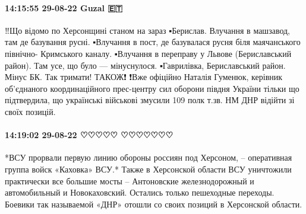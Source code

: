 
 
 
 
 

\paragraph{14:15:55 29-08-22 Guzal 🇪🇹}

‼️Що відомо по Херсонщині станом на зараз
▪️Берислав. Влучання в машзавод, там де базування русні.
▪️Влучання в пост, де базувалася русня біля маячанського північно- Кримського каналу.
▪️Влучання в переправу у Львове (Бериславський район). Там усе, що було — мінуснулося.
▪️Гаврилівка, Бериславський район. Мінус БК.
Так тримати!
ТАКОЖ❗️
❗️Вже офіційно
Наталія Гуменюк, керівник об'єднаного координаційного прес-центру сил оборони півдня України тільки що підтвердила, що українські військові змусили 109 полк т.зв. НМ ДНР відійти зі своїх позицій.

\paragraph{14:19:02 29-08-22 ♡♡♡♡♡ ♡♡♡♡♡♡♡}

*ВСУ прорвали первую линию обороны россиян под Херсоном, – оперативная группа
войск «Каховка» ВСУ.* Также в Херсонской области ВСУ уничтожили практически все
большие мосты – Антоновские железнодорожный и автомобильный и Новокаховский.
Остались только пешеходные переходы. Боевики так называемой «ДНР» отошли со
своих позиций в Херсонской области.
